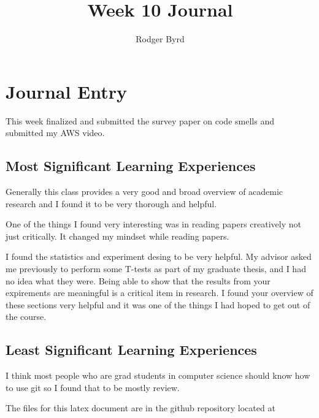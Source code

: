 \documentclass[conference]{IEEEtran}
\begin{document}

\title{Week 10 Journal}
\author{Rodger Byrd}
\maketitle



\section{Journal Entry}
This week finalized and submitted the survey paper on code smells and submitted my AWS video.

\subsection{Most Significant Learning Experiences}
Generally this class provides a very good and broad overview of academic research and I found it to be very thorough and helpful.

One of the things I found very interesting was in reading papers creatively not just critically. 
It changed my mindset while reading papers. 

I found the statistics and experiment desing to be very helpful. 
My advisor asked me previously to perform some T-tests as part of my graduate thesis, and I had no idea what they were. 
Being able to show that the results from your expirements are meaningful is a critical item in research. 
I found your overview of these sections very helpful and it was one of the things I had hoped to get out of the course.


\subsection{Least Significant Learning Experiences}
I think most people who are grad students in computer science should know how to use git so I found that to be mostly review.

The files for this latex document are in the github repository located at 

\nocite{*}
\clearpage


%
%
\end{document}
